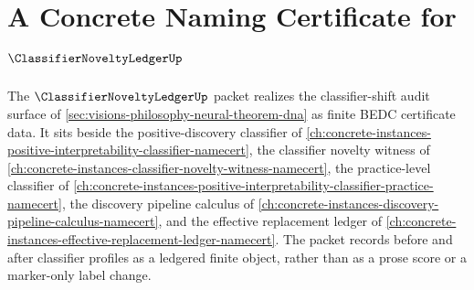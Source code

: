 \chapter{A Concrete Naming Certificate for $\ClassifierNoveltyLedgerUp$}
\label{ch:concrete-instances-classifier-novelty-ledger-namecert}

The $\ClassifierNoveltyLedgerUp$ packet realizes the classifier-shift audit surface of \autoref{sec:visions-philosophy-neural-theorem-dna} as finite BEDC certificate data. It sits beside the positive-discovery classifier of \autoref{ch:concrete-instances-positive-interpretability-classifier-namecert}, the classifier novelty witness of \autoref{ch:concrete-instances-classifier-novelty-witness-namecert}, the practice-level classifier of \autoref{ch:concrete-instances-positive-interpretability-classifier-practice-namecert}, the discovery pipeline calculus of \autoref{ch:concrete-instances-discovery-pipeline-calculus-namecert}, and the effective replacement ledger of \autoref{ch:concrete-instances-effective-replacement-ledger-namecert}. The packet records before and after classifier profiles as a ledgered finite object, rather than as a prose score or a marker-only label change.

